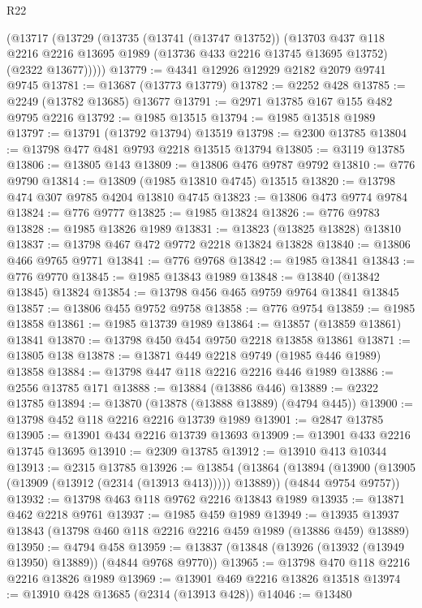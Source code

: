 \begin{lexlean}{R22}
\begin{coremodule}
    (@13717
      (@13729
        (@13735
          (@13741 (@13747 @13752))
          (@13703
            @437
            @118
            @2216
            @2216
            @13695
            @1989
            (@13736 @433 @2216 @13745 @13695 @13752)
            (@2322 @13677)))))
@13779 := @4341 @12926 @12929 @2182 @2079 @9741 @9745
@13781 := @13687 (@13773 @13779)
@13782 := @2252 @428
@13785 := @2249 (@13782 @13685) @13677
@13791 := @2971 @13785 @167 @155 @482 @9795 @2216
@13792 := @1985 @13515
@13794 := @1985 @13518 @1989
@13797 := @13791 (@13792 @13794) @13519
@13798 := @2300 @13785
@13804 := @13798 @477 @481 @9793 @2218 @13515 @13794
@13805 := @3119 @13785
@13806 := @13805 @143
@13809 := @13806 @476 @9787 @9792
@13810 := @776 @9790
@13814 := @13809 (@1985 @13810 @4745) @13515
@13820 := @13798 @474 @307 @9785 @4204 @13810 @4745
@13823 := @13806 @473 @9774 @9784
@13824 := @776 @9777
@13825 := @1985 @13824
@13826 := @776 @9783
@13828 := @1985 @13826 @1989
@13831 := @13823 (@13825 @13828) @13810
@13837 := @13798 @467 @472 @9772 @2218 @13824 @13828
@13840 := @13806 @466 @9765 @9771
@13841 := @776 @9768
@13842 := @1985 @13841
@13843 := @776 @9770
@13845 := @1985 @13843 @1989
@13848 := @13840 (@13842 @13845) @13824
@13854 := @13798 @456 @465 @9759 @9764 @13841 @13845
@13857 := @13806 @455 @9752 @9758
@13858 := @776 @9754
@13859 := @1985 @13858
@13861 := @1985 @13739 @1989
@13864 := @13857 (@13859 @13861) @13841
@13870 := @13798 @450 @454 @9750 @2218 @13858 @13861
@13871 := @13805 @138
@13878 := @13871 @449 @2218 @9749 (@1985 @446 @1989) @13858
@13884 := @13798 @447 @118 @2216 @2216 @446 @1989
@13886 := @2556 @13785 @171
@13888 := @13884 (@13886 @446)
@13889 := @2322 @13785
@13894 := @13870 (@13878 (@13888 @13889) (@4794 @445))
@13900 := @13798 @452 @118 @2216 @2216 @13739 @1989
@13901 := @2847 @13785
@13905 := @13901 @434 @2216 @13739 @13693
@13909 := @13901 @433 @2216 @13745 @13695
@13910 := @2309 @13785
@13912 := @13910 @413 @10344
@13913 := @2315 @13785
@13926 := @13854
    (@13864
      (@13894 (@13900 (@13905 (@13909 (@13912 (@2314 (@13913 @413))))) @13889))
      (@4844 @9754 @9757))
@13932 := @13798 @463 @118 @9762 @2216 @13843 @1989
@13935 := @13871 @462 @2218 @9761
@13937 := @1985 @459 @1989
@13949 := @13935 @13937 @13843 (@13798 @460 @118 @2216 @2216 @459 @1989 (@13886 @459) @13889)
@13950 := @4794 @458
@13959 := @13837 (@13848 (@13926 (@13932 (@13949 @13950) @13889)) (@4844 @9768 @9770))
@13965 := @13798 @470 @118 @2216 @2216 @13826 @1989
@13969 := @13901 @469 @2216 @13826 @13518
@13974 := @13910 @428 @13685 (@2314 (@13913 @428))
@14046 := @13480

\end{coremodule}
\end{lexlean}
